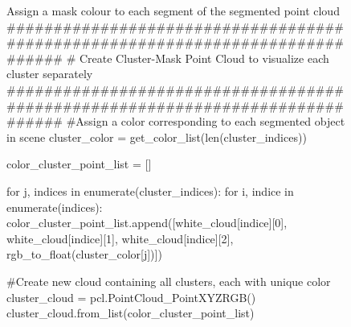 \documentclass[a4paper]{article}
\begin{document}
\begin{figure}[h]\scriptsize
\begin{sexylisting}{Assign a mask colour to each segment of the segmented point cloud}
##############################################################################
    # Create Cluster-Mask Point Cloud to visualize each cluster separately
##############################################################################
    #Assign a color corresponding to each segmented object in scene
    cluster_color = get_color_list(len(cluster_indices))

    color_cluster_point_list = []

    for j, indices in enumerate(cluster_indices):
        for i, indice in enumerate(indices):
            color_cluster_point_list.append([white_cloud[indice][0],
                                            white_cloud[indice][1],
                                            white_cloud[indice][2],
                                            rgb_to_float(cluster_color[j])])

    #Create new cloud containing all clusters, each with unique color
    cluster_cloud = pcl.PointCloud_PointXYZRGB()
    cluster_cloud.from_list(color_cluster_point_list)
\end{sexylisting}
\end{figure}
\end{document}
